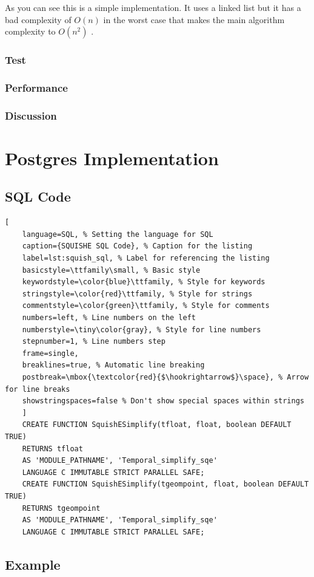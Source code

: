 \documentclass[twoside,12pt, a4paper]{report}
\begin{document}
As you can see this is a simple implementation. It uses a linked list but it has a bad complexity of $O(n)$ in the worst case that makes the main algorithm complexity to $O(n^{2})$ .

\subsubsection{Test}
\subsubsection{Performance}
\subsubsection{Discussion}


\section{Postgres Implementation}
\subsection{SQL Code}
\begin{lstlisting}[
	language=SQL, % Setting the language for SQL
	caption={SQUISHE SQL Code}, % Caption for the listing
	label=lst:squish_sql, % Label for referencing the listing
	basicstyle=\ttfamily\small, % Basic style
	keywordstyle=\color{blue}\ttfamily, % Style for keywords
	stringstyle=\color{red}\ttfamily, % Style for strings
	commentstyle=\color{green}\ttfamily, % Style for comments
	numbers=left, % Line numbers on the left
	numberstyle=\tiny\color{gray}, % Style for line numbers
	stepnumber=1, % Line numbers step
	frame=single,
	breaklines=true, % Automatic line breaking
	postbreak=\mbox{\textcolor{red}{$\hookrightarrow$}\space}, % Arrow for line breaks
	showstringspaces=false % Don't show special spaces within strings
	]
	CREATE FUNCTION SquishESimplify(tfloat, float, boolean DEFAULT TRUE)
	RETURNS tfloat
	AS 'MODULE_PATHNAME', 'Temporal_simplify_sqe'
	LANGUAGE C IMMUTABLE STRICT PARALLEL SAFE;
	CREATE FUNCTION SquishESimplify(tgeompoint, float, boolean DEFAULT TRUE)
	RETURNS tgeompoint
	AS 'MODULE_PATHNAME', 'Temporal_simplify_sqe'
	LANGUAGE C IMMUTABLE STRICT PARALLEL SAFE;
\end{lstlisting}

\subsection{Example}
\end{document}
